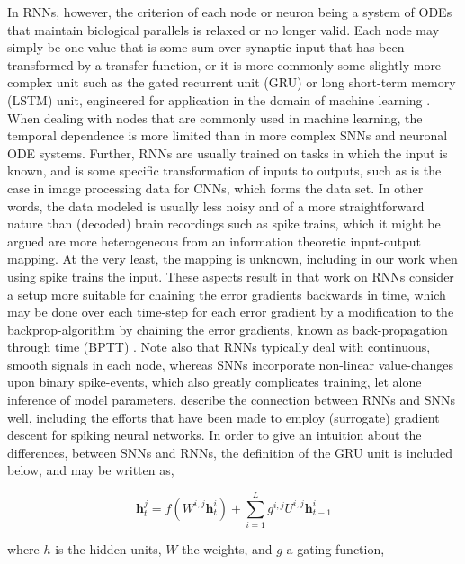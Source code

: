 \documentclass[mphil,deptreport,ianc]{infthesis} %
\begin{document}
In RNNs, however, the criterion of each node or neuron being a system of ODEs that maintain biological parallels is relaxed or no longer valid. 
Each node may simply be one value that is some sum over synaptic input that has been transformed by a transfer function, or it is more commonly some slightly more complex unit such as the gated recurrent unit (GRU) \cite{Bengio2013b, Chung2015a} or long short-term memory (LSTM) unit, engineered for application in the domain of machine learning \cite{Hochreiter1997, Schmidhuber2014}.
When dealing with nodes that are commonly used in machine learning, the temporal dependence is more limited than in more complex SNNs and neuronal ODE systems.
Further, RNNs are usually trained on tasks in which the input is known, and is some specific transformation of inputs to outputs, such as is the case in image processing data for CNNs, which forms the data set.
In other words, the data modeled is usually less noisy and of a more straightforward nature than (decoded) brain recordings such as spike trains, which it might be argued are more heterogeneous from an information theoretic input-output mapping. At the very least, the mapping is unknown, including in our work when using spike trains the input.
These aspects result in that work on RNNs consider a setup more suitable for chaining the error gradients backwards in time, which may be done over each time-step for each error gradient by a modification to the backprop-algorithm by chaining the error gradients, known as back-propagation through time (BPTT) \cite{Rumelhart1986}.
Note also that RNNs typically deal with continuous, smooth signals in each node, whereas SNNs incorporate non-linear value-changes upon binary spike-events, which also greatly complicates training, let alone inference of model parameters.
\cite{Neftci2019} describe the connection between RNNs and SNNs well, including the efforts that have been made to employ (surrogate) gradient descent for spiking neural networks.
In order to give an intuition about the differences, between SNNs and RNNs, the definition of the GRU unit is included below, and may be written as,

\begin{equation}
    \textbf{h}_t^j = \textit{f}(W^{i,j}\textbf{h}_t^i) + \sum_{i=1}^L g^{i,j} U^{i,j}\textbf{h}_{t-1}^i
\end{equation}

where $h$ is the hidden units, $W$ the weights, and $g$ a gating function,
\end{document}

